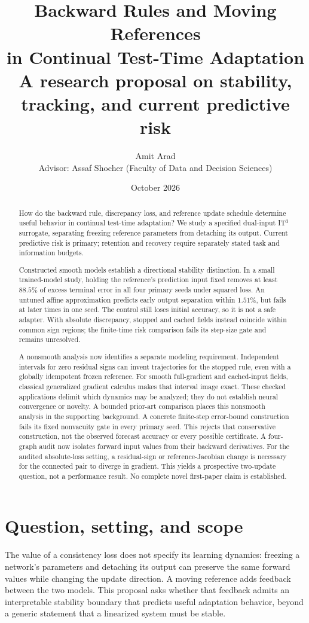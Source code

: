 \documentclass[11pt,a4paper]{article}
\title{Backward Rules and Moving References\\in Continual Test-Time Adaptation\\[0.4em]
\large A research proposal on stability, tracking, and current predictive risk}
\author{Amit Arad\\[0.3em]
\small Advisor: Assaf Shocher (Faculty of Data and Decision Sciences)}
\date{October 2026}
\begin{document}
\maketitle
\begin{abstract}
How do the backward rule, discrepancy loss, and reference update schedule
determine useful behavior in continual test-time adaptation? We study a
specified dual-input IT$^3$ surrogate, separating freezing reference
parameters from detaching its output. Current predictive risk is primary;
retention and recovery require separately stated task and information budgets.

Constructed smooth models establish a directional stability distinction.
In a small trained-model study, holding the reference's prediction input
fixed removes at least $88.5\%$ of excess terminal error in all four primary
seeds under squared loss. An untuned affine approximation predicts early
output separation within $1.51\%$, but fails at later times in one seed.
The control still loses initial accuracy, so it is not a safe adapter.
With absolute discrepancy, stopped and cached fields instead coincide
within common sign regions; the finite-time risk comparison fails its
step-size gate and remains unresolved.

A nonsmooth analysis now identifies a separate modeling requirement.
Independent intervals for zero residual signs can invent trajectories for
the stopped rule, even with a globally idempotent frozen reference.
For smooth full-gradient and cached-input fields, classical generalized
gradient calculus makes that interval image exact. These checked
applications delimit which dynamics may be analyzed; they do not establish
neural convergence or novelty. A bounded prior-art comparison places this
nonsmooth analysis in the supporting background. A concrete finite-step
error-bound construction fails its fixed nonvacuity gate in every primary
seed. This rejects that conservative construction, not the observed forecast
accuracy or every possible certificate. A four-graph audit now isolates
forward input values from their backward derivatives. For the audited
absolute-loss setting, a residual-sign or reference-Jacobian change is
necessary for the connected pair to diverge in gradient.
This yields a prospective two-update question, not a performance result.
No complete novel first-paper claim is established.
\end{abstract}

\section{Question, setting, and scope}
The value of a consistency loss does not specify its learning dynamics:
freezing a network's parameters and detaching its output can preserve the
same forward values while changing the update direction. A moving reference
adds feedback between the two models. This proposal asks whether that
feedback admits an interpretable stability boundary that predicts useful
adaptation behavior, beyond a generic statement that a linearized system
must be stable.
\end{document}
